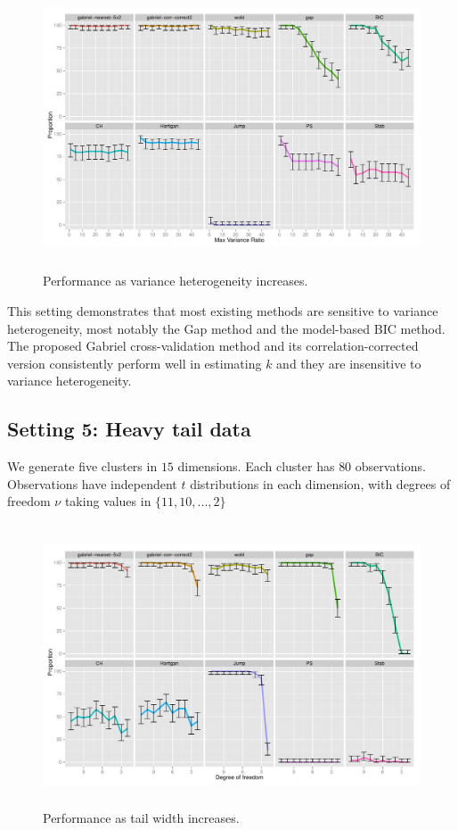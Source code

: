 \documentclass[12pt]{article}
\begin{document}
\begin{figure}[H]
\centering
\includegraphics[width=5.5in, height=3.3in]{New simulation/demo/bench/setting4/Facet.pdf}
\caption{Performance as variance heterogeneity increases.}
\label{fig:setting4}
\end{figure}

This setting demonstrates that most existing methods are sensitive to variance
heterogeneity, most notably the Gap method and the model-based BIC method. The
proposed Gabriel cross-validation method and its correlation-corrected version
consistently perform well in estimating $k$ and they are insensitive to
variance heterogeneity.
	

\subsection{Setting 5: Heavy tail data}

We generate five clusters in $15$ dimensions. Each cluster has $80$
observations.  Observations have independent $t$ distributions in each
dimension, with degrees of freedom $\nu$ taking values in $\{11,10,...,2\}$
     
\begin{figure}[H]
\centering
\includegraphics[width=5.5in, height=3.3in]{New simulation/demo/bench/setting5/Facet.pdf}
\caption{Performance as tail width increases.}
\label{fig:setting5}
\end{figure}
\end{document}
